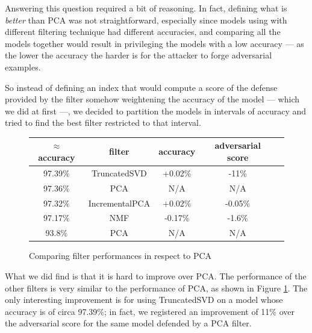 Answering this question required a bit of reasoning. In fact, defining
what is \emph{better} than PCA was not straightforward, especially since
models using with different filtering technique had different
accuracies, and comparing all the models together would result in
privileging the models with a low accuracy --- as the lower the
accuracy the harder is for the attacker to forge adversarial examples.

So instead of defining an index that would compute a score of the
defense provided by the filter somehow weightening the accuracy of the
model --- which we did at first ---, we decided to partition the models
in intervals of accuracy and tried to find the best filter restricted
to that interval.

\begin{figure}
  \centering
  \begin{tabular}{|c|c|c|c|c|}
    \hline
    $\approx$accuracy & filter & accuracy & adversarial score\\
    \hline
    \hline
    97.39\% & TruncatedSVD & +0.02\% & -11\% \\
    \hline
    97.36\% & PCA & N/A & N/A \\
    \hline
    97.32\% & IncrementalPCA & +0.02\% & -0.05\% \\
    \hline
    97.17\% & NMF & -0.17\% & -1.6\% \\
    \hline
    93.8\% & PCA & N/A & N/A \\
    \hline
  \end{tabular}
  \caption{Comparing filter performances in respect to PCA}
  \label{fig:filters-comparison}
\end{figure}

What we did find is that it is hard to improve over PCA. The performance
of the other filters is very similar to the performance of PCA, as
shown in Figure \ref{fig:filters-comparison}. The only interesting
improvement is for using TruncatedSVD on a model whose accuracy is of
circa 97.39\%; in fact, we registered an improvement of 11\% over the
adversarial score for the same model defended by a PCA filter.
